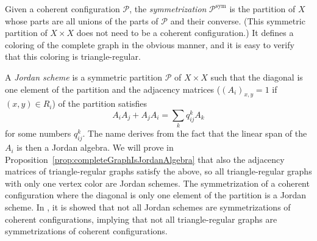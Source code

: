 \documentclass[a4paper, 11pt]{amsart}
\numberwithin{theorem}{section}
\begin{document}
Given a coherent configuration $\mathcal{P}$, the \emph{symmetrization}
$\mathcal{P}^{\operatorname{sym}}$ is the partition of $X$ whose parts
are all unions of the parts of $\mathcal{P}$ and their converse. (This
symmetric partition of $X \times X$ does not need to be a coherent
configuration.) It defines a coloring of the complete graph in the obvious
manner, and it is easy to verify that this coloring is triangle-regular.

A \emph{Jordan scheme} is a symmetric partition $\mathcal{P}$ of $X \times X$ such that the diagonal is one element of the partition and the adjacency matrices ($(A_i)_{x,y} = 1 $ if $(x,y)\in R_i$) of the partition satisfies
\[
A_i A_j + A_j A_i = \sum _k q_{ij}^k A_k
\]
for some numbers $q_{ij}^k$. The name derives from the fact that the
linear span of the $A_i$ is then a Jordan algebra.
We will prove in Proposition~\ref{prop:completeGraphIsJordanAlgebra}
that also the adjacency matrices of triangle-regular graphs satisfy the
above, so all triangle-regular graphs with only one vertex color are
Jordan schemes. The symmetrization of a coherent configuration where
the diagonal is only one element of the partition is a Jordan scheme.
In \cite{KRM2019properjordanschemesexist}, it is showed that not all
Jordan schemes are symmetrizations of coherent configurations,
implying that not all triangle-regular graphs are symmetrizations of coherent configurations.
\end{document}
